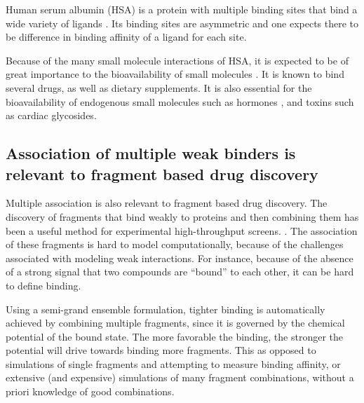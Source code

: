 \documentclass[10pt,final]{article}
\begin{document}
Human serum albumin (HSA) is a protein with multiple binding sites that bind a wide variety of ligands \cite{He1992a,Kragh-Hansen2002a,Sulkowska2002a}. Its binding sites are asymmetric\cite{He1992a, Curry1998a} and one expects there to be difference in binding affinity of a ligand for each site\cite{Sudlow1976a}.


Because of the many small molecule interactions of HSA, it is expected to be of great importance to the bioavailability of small molecules \cite{Metcalfe2010a}. It is known to bind several drugs\cite{SJOeHOLM1979a,Bannwarth1996a,Sulkowska2002a,Ghuman2005a,Perez2007a}, as well as dietary supplements\cite{Pal2013a}. It is also essential for the bioavailability of endogenous small molecules such as hormones \cite{Pardridge1986a}, and toxins such as cardiac glycosides\cite{Smith1985a}. 

\subsection*{Association of multiple weak binders is relevant to fragment based drug discovery}
Multiple association is also relevant to fragment based drug discovery. The discovery of fragments that bind weakly to proteins and then combining them has been a useful method for experimental high-throughput screens. \cite{Hajduk2007a}. The association of these fragments is hard to model computationally, because of the challenges associated with modeling weak interactions. For instance, because of the absence of a strong signal that two compounds are ``bound'' to each other, it can be hard to define binding\cite{Gilson1997a}. 

Using a semi-grand ensemble formulation, tighter binding is automatically achieved by combining multiple fragments, since it is governed by the chemical potential of the bound state. The more favorable the binding, the stronger the potential will drive towards binding more fragments. This as opposed to simulations of single fragments and attempting to measure binding affinity, or extensive (and expensive) simulations of many fragment combinations, without a priori knowledge of good combinations. 

\end{document}
